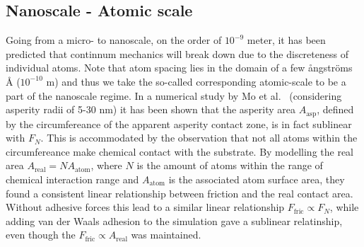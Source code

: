 

\subsection{Nanoscale - Atomic scale}
Going from a micro- to nanoscale, on the order of $10^{-9}$ meter, it has been
predicted that continnum mechanics will break down \cite{luan_breakdown_2005}
due to the discreteness of individual atoms. Note that atom spacing lies in the
domain of a few ångströms Å ($10^{-10}$ m) and thus we take the so-called
corresponding atomic-scale to be a part of the nanoscale regime. In a numerical
study by Mo et al.\ \cite{mo_friction_2009} (considering asperity radii of 5-30
nm) it has been shown that the asperity area $A_{\text{asp}}$, defined by the
circumfereance of the apparent asperity contact zone, is in fact sublinear with
$F_N$. This is accommodated by the observation that not all atoms within the
circumfereance make chemical contact with the substrate. By
modelling the real area $A_{\text{real}} = NA_{\text{atom}}$, where $N$ is the
amount of atoms within the range of chemical interaction range and
$A_{\text{atom}}$ is the associated atom surface area, they found a consistent
linear relationship between friction and the real contact area. Without adhesive
forces this lead to a similar linear relationship $F_{\text{fric}} \propto F_N$,
while adding van der Waals adhesion to the simulation gave a sublinear
relatinship, even though the $F_{\text{fric}} \propto A_{\text{real}}$ was
maintained. 

